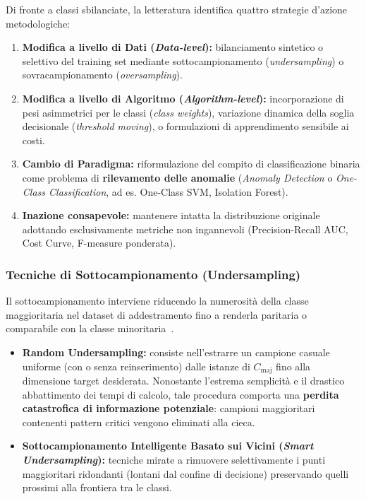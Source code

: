 Di fronte a classi sbilanciate, la letteratura identifica quattro strategie d'azione metodologiche:
\begin{enumerate}
    \item \textbf{Modifica a livello di Dati (\textit{Data-level}):} bilanciamento sintetico o selettivo del training set mediante sottocampionamento (\textit{undersampling}) o sovracampionamento (\textit{oversampling}).
    \item \textbf{Modifica a livello di Algoritmo (\textit{Algorithm-level}):} incorporazione di pesi asimmetrici per le classi (\textit{class weights}), variazione dinamica della soglia decisionale (\textit{threshold moving}), o formulazioni di apprendimento sensibile ai costi.
    \item \textbf{Cambio di Paradigma:} riformulazione del compito di classificazione binaria come problema di \textbf{rilevamento delle anomalie} (\textit{Anomaly Detection} o \textit{One-Class Classification}, ad es. One-Class SVM, Isolation Forest).
    \item \textbf{Inazione consapevole:} mantenere intatta la distribuzione originale adottando esclusivamente metriche non ingannevoli (Precision-Recall AUC, Cost Curve, F-measure ponderata).
\end{enumerate}

\FloatBarrier
\subsubsection{Tecniche di Sottocampionamento (Undersampling)}
\label{subsec:dm-undersampling}

Il sottocampionamento interviene riducendo la numerosità della classe maggioritaria nel dataset di addestramento fino a renderla paritaria o comparabile con la classe minoritaria~\cite{mannocci2026imbalanced}.

\begin{itemize}
    \item \textbf{Random Undersampling:} consiste nell'estrarre un campione casuale uniforme (con o senza reinserimento) dalle istanze di $C_{\text{maj}}$ fino alla dimensione target desiderata.
    Nonostante l'estrema semplicità e il drastico abbattimento dei tempi di calcolo, tale procedura comporta una \textbf{perdita catastrofica di informazione potenziale}: campioni maggioritari contenenti pattern critici vengono eliminati alla cieca.
    \item \textbf{Sottocampionamento Intelligente Basato sui Vicini (\textit{Smart Undersampling}):} tecniche mirate a rimuovere selettivamente i punti maggioritari ridondanti (lontani dal confine di decisione) preservando quelli prossimi alla frontiera tra le classi.
\end{itemize}

